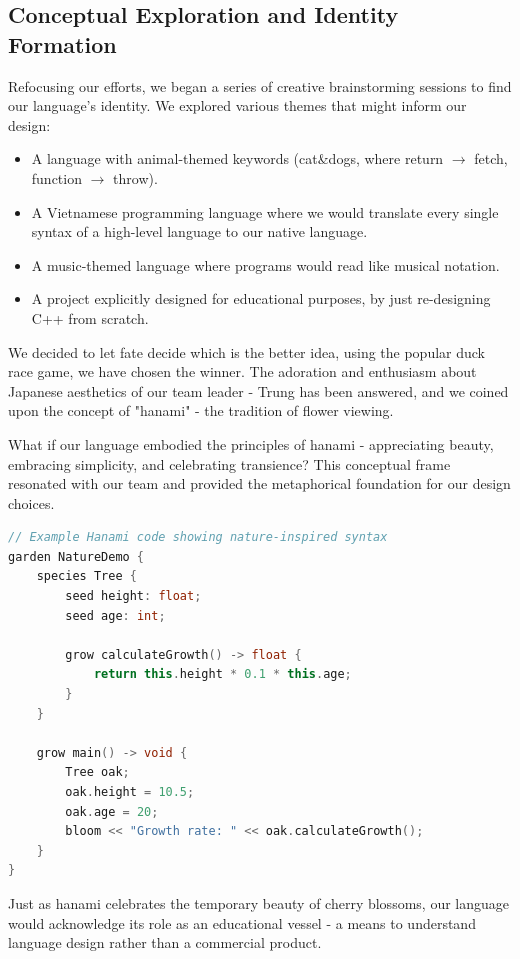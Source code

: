 \documentclass[conference]{IEEEtran}
\begin{document}
\subsection{Conceptual Exploration and Identity Formation}
Refocusing our efforts, we began a series of creative brainstorming sessions to find our language's identity. We explored various themes that might inform our design:
\begin{itemize}
    \item A language with animal-themed keywords (cat\&dogs, where return $\rightarrow$ fetch, function $\rightarrow$ throw).
    \item A Vietnamese programming language where we would translate every single syntax of a high-level language to our native language.
    \item A music-themed language where programs would read like musical notation.
    \item A project explicitly designed for educational purposes, by just re-designing C++ from scratch.
\end{itemize}
We decided to let fate decide which is the better idea, using the popular duck race game, we have chosen the winner. The adoration and enthusiasm about Japanese aesthetics of our team leader - Trung has been answered, and we coined upon the concept of "hanami" - the tradition of flower viewing.

What if our language embodied the principles of hanami - appreciating beauty, embracing simplicity, and celebrating transience? This conceptual frame resonated with our team and provided the metaphorical foundation for our design choices.

\begin{lstlisting}[language=C++, caption={Example Hanami code showing nature-inspired syntax}, label={lst:nature_demo}]
// Example Hanami code showing nature-inspired syntax
garden NatureDemo {
    species Tree {
        seed height: float;
        seed age: int;

        grow calculateGrowth() -> float {
            return this.height * 0.1 * this.age;
        }
    }

    grow main() -> void {
        Tree oak;
        oak.height = 10.5;
        oak.age = 20;
        bloom << "Growth rate: " << oak.calculateGrowth();
    }
}
\end{lstlisting}
Just as hanami celebrates the temporary beauty of cherry blossoms, our language would acknowledge its role as an educational vessel - a means to understand language design rather than a commercial product.
\end{document}
